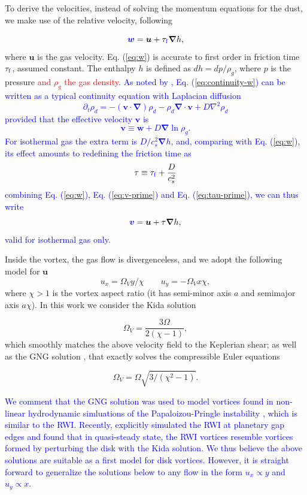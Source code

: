 \documentclass[apj]{emulateapj}
\renewcommand{\v}[1]{{\boldsymbol{#1}}} %
\def\blue#1{\textcolor{blue}{#1}}
\def\red#1{\textcolor{red}{#1}}
\newcommand{\del}{\v{\nabla}}
\newcommand{\grad}{\del}
\newcommand{\Div}{\del\cdot}
\newcommand{\Laplace}{\nabla^2}
\newcommand{\Eq}[1]{Eq. (\ref{#1})}
\newcommand{\eq}[1]{\Eq{#1}}
\newcommand{\beq}{\begin{equation}}
\newcommand{\eeq}{\end{equation}}
\newcommand{\tauf}{\tau_{\rm \blue{f}}}
\begin{document}
To derive the velocities, instead of solving the momentum equations
for the dust, we make use of the relative velocity, following
\citet[see also \citealt{Youdin08}]{Youdin-Goodman05}

\beq
\blue{\v{w}} = \v{u} + \tauf  \grad{h}, 
\label{eq:w}
\eeq
\noindent where $\v{u}$ is the gas velocity. \eq{eq:w} is 
accurate to first order in friction time $\tauf$, assumed 
constant. The enthalpy $h$ is defined as $dh = dp /\rho_g$, where $p$ 
is the pressure \red{ and $\rho_g$ the gas density}. \blue{As noted by
\cite{Charnoz11}, \eq{eq:continuity-w} can be written as a typical continuity equation with Laplacian diffusion 
\beq
\partial_t \rho_d = -(\v{v} \cdot\del)\rho_d - \rho_d \Div{\v{v}} + D\Laplace\rho_d \label{eq:continuity}
\eeq
\noindent provided that the effective velocity $\v{v}$ is 
\beq
\v{v} \equiv \v{w}  + D\grad\ln \rho_g\label{eq:v-prime}.
\eeq\noindent For isothermal gas the extra term is $D/c_s^2 \grad{h}$,
and, comparing with \eq{eq:w}, its effect amounts to redefining the
friction time as 
\beq
\tau \equiv \tauf + \frac{D}{c_s^2}\label{eq:tau-prime}
\eeq
\noindent combining \eq{eq:w}, \eq{eq:v-prime} and \eq{eq:tau-prime},
we can thus write
\beq
\blue{\v{v}} = \v{u} + \tau \grad{h}, \label{eq:v}
\eeq \noindent valid for isothermal gas only.}

Inside the vortex, the gas flow is divergenceless, and 
we adopt the following model for $\v{u}$
\beq
  u_x = \varOmega_V y / \chi \qquad  u_y= -\varOmega_V x \chi,
  \label{eq:vortex}
\eeq
\noindent where $\chi > 1$ is the vortex aspect ratio (it has
semi-minor axis $a$ and semimajor axis $a\chi$). In this work
we consider the Kida solution \citep{Kida81}

\beq
\varOmega_V = \frac{3\varOmega}{2(\chi-1)},  
\eeq
which smoothly matches the above velocity field to the Keplerian
shear; as well as the GNG solution \citep{Goodman87}, that exactly solves the 
compressible Euler equations 

\beq
\varOmega_V=\varOmega\sqrt{3/(\chi^2-1)}.
\eeq

\blue{We comment that the GNG solution was used to model vortices found in non-linear hydrodynamic simluations of the Papaloizou-Pringle instability \citep{Hawley87}, which is similar to the RWI. Recently, \cite{Lin-Papaloizou11a} explicitly simulated the RWI at planetary gap edges and found that in quasi-steady state, the RWI vortices resemble  vortices formed by perturbing the disk with the Kida solution. We thus believe the above solutions are suitable as a first model for disk vortices.  However, it is straight forward to generalize the solutions 
below to any flow in the form $u_x\propto y$ and $u_y\propto x$. 
}
\end{document}
